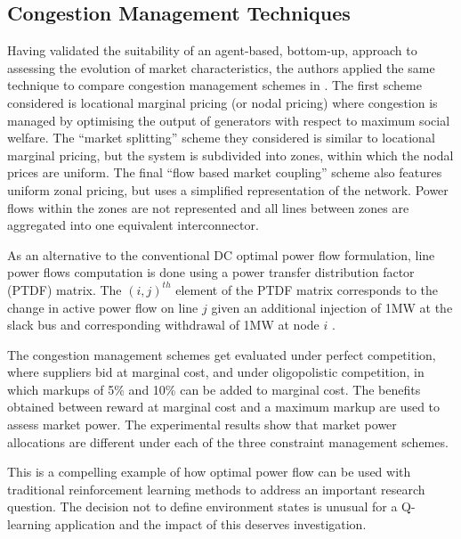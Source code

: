 \subsection{Congestion Management Techniques}
Having validated the suitability of an agent-based, bottom-up, approach to
assessing the evolution of market characteristics, the authors applied the same
technique to compare congestion management schemes in .
The first scheme considered is locational marginal pricing (or nodal
pricing) where congestion is managed by optimising the output of generators
with respect to maximum social welfare.
The ``market splitting'' scheme they considered is similar to locational
marginal pricing, but the system is subdivided into zones, within which the
nodal prices are uniform.  The final ``flow based market coupling'' scheme
also features uniform zonal pricing, but uses a simplified representation
of the network.  Power flows within the zones are not represented and all lines
between zones are aggregated into one equivalent interconnector.

As an alternative to the conventional DC optimal power flow formulation, line
power flows computation is done using a power transfer distribution
factor (PTDF) matrix.  The $(i,j)^{th}$ element of the PTDF matrix corresponds
to the change in active power flow on line $j$ given an additional injection of
1MW at the slack bus and corresponding withdrawal of 1MW at node $i$
\cite{grainger:psa}.

The congestion management schemes get evaluated under perfect competition,
where suppliers bid at marginal cost, and under oligopolistic competition, in
which markups of 5\% and 10\% can be added to marginal cost.  The benefits
obtained between reward at marginal cost and a maximum markup are used to
assess market power.  The experimental results show that market power
allocations are different under each of the three constraint management
schemes.

This is a compelling example of how optimal power flow can be used with
traditional reinforcement learning methods to address an important research
question.  The decision not to define environment states is unusual for a
Q-learning application and the impact of this deserves investigation.

